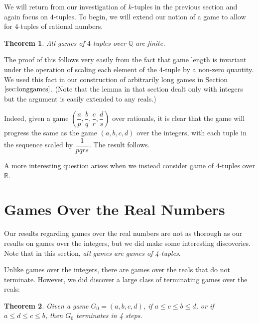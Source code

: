 \documentclass[12pt]{amsart}
\newtheorem{theorem}{Theorem}[section]
\begin{document}
We will return from our investigation of $k$-tuples in the previous section and again focus on $4$-tuples. To begin, we will extend our notion of a game to allow for $4$-tuples of rational numbers.

\begin{theorem}
All games of $4$-tuples over $\mathbb{Q}$ are finite.
\end{theorem}

The proof of this follows very easily from the fact that game length is invariant under the operation of scaling each element of the $4$-tuple by a non-zero quantity. We used this fact in our construction of arbitrarily long games in Section $\ref{sec:longgames}$. (Note that the lemma in that section dealt only with integers but the argument is easily extended to any reals.)

Indeed, given a game $\left(\dfrac{a}{p}, \dfrac{b}{q}, \dfrac{c}{r}, \dfrac{d}{s}\right)$ over rationals, it is clear that the game will progress the same as the game $(a, b, c, d)$ over the integers, with each tuple in the sequence scaled by $\dfrac{1}{pqrs}$. The result follows.

A more interesting question arises when we instead consider game of $4$-tuples over $\mathbb{R}$.

\section{Games Over the Real Numbers}

Our results regarding games over the real numbers are not as thorough as our results on games over the integers, but we did make some interesting discoveries. Note that in this section, \emph{all games are games of 4-tuples}.

Unlike games over the integers, there are games over the reals that do not terminate. However, we did discover a large class of terminating games over the reals:

\begin {theorem}
\label{thm:inequalities}
Given a game $G_0 =  (a, b, c, d)$, if $a \leq c \leq b \leq d$, or if $a \leq d \leq c \leq b$, then $G_0$ terminates in 4 steps. 
\end{theorem}
\end{document}
